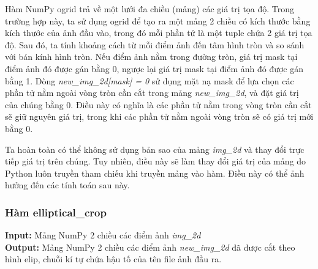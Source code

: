 \documentclass[]{article}
\begin{document}
Hàm NumPy ogrid trả về một lưới đa chiều (mảng) các giá trị tọa độ. Trong trường hợp này, ta sử dụng ogrid để tạo ra một mảng 2 chiều có kích thước bằng kích thước của ảnh đầu vào, trong đó mỗi phần tử là một tuple chứa 2 giá trị tọa độ. Sau đó, ta tính khoảng cách từ mỗi điểm ảnh đến tâm hình tròn và so sánh với bán kính hình tròn. Nếu điểm ảnh nằm trong đường tròn, giá trị mask tại điểm ảnh đó được gán bằng 0, ngược lại giá trị mask tại điểm ảnh đó được gán bằng 1. Dòng \textit{new\_img\_2d[mask] = 0} sử dụng mặt nạ mask để lựa chọn các phần tử nằm ngoài vòng tròn cần cắt trong mảng \textit{new\_img\_2d}, và đặt giá trị của chúng bằng 0. Điều này có nghĩa là các phần tử nằm trong vòng tròn cần cắt sẽ giữ nguyên giá trị, trong khi các phần tử nằm ngoài vòng tròn sẽ có giá trị mới bằng 0.

Ta hoàn toàn có thể không sử dụng bản sao của mảng \textit{img\_2d} và thay đổi trực tiếp giá trị trên chúng. Tuy nhiên, điều này sẽ làm thay đổi giá trị của mảng do Python luôn truyền tham chiếu khi truyền mảng vào hàm. Điều này có thể ảnh hưởng đến các tính toán sau này.

\subsubsection{Hàm elliptical\_crop}
\textbf{Input:} Mảng NumPy 2 chiều các điểm ảnh \textit{img\_2d} \\
\textbf{Output:} Mảng NumPy 2 chiều các điểm ảnh \textit{new\_img\_2d} đã được cắt theo hình elip, chuỗi kí tự chứa hậu tố của tên file ảnh đầu ra.
\end{document}
